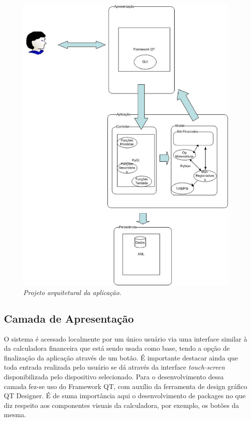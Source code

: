 \begin{figure}[!h]
 \centering
 \includegraphics[scale=0.5]{arquitetura.eps}
 \caption{\it Projeto arquitetural da aplicação.} \label{fig:arquit}
\end{figure}

\subsection{Camada de Apresentação}
O sistema é acessado localmente por um único usuário via uma interface similar à da calculadora financeira que está sendo usada como base, tendo a opção de finalização da aplicação através de um botão. É importante destacar ainda que toda entrada realizada pelo usuário se dá através da interface \textit{touch-screen} disponibilizada pelo dispositivo selecionado.
Para o desenvolvimento dessa camada fez-se uso do Framework QT, com auxílio da ferramenta de design gráfico QT Designer. É de suma importância aqui o desenvolvimento de packages no que diz respeito aos componentes visuais da calculadora, por exemplo, os botões da mesma.


